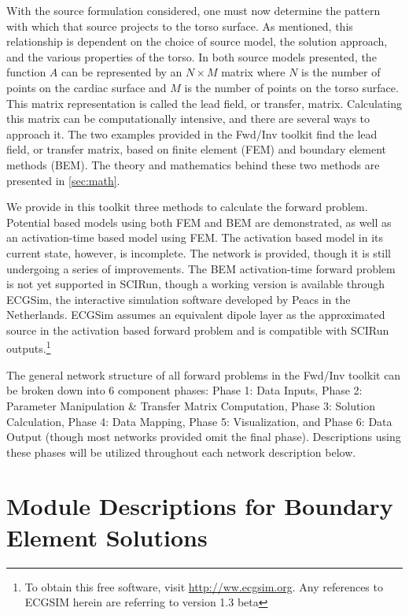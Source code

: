 With the source formulation considered, one must now determine the pattern with which that source projects to the torso surface. As mentioned, this relationship is dependent on the choice of source model, the solution approach, and the various properties of the torso. In both source models presented, the function $A$ can be represented by an $N \times M$ matrix where $N$ is the number of points on the cardiac surface and $M$ is the number of points on the torso surface.  This matrix representation is called the lead field, or transfer, matrix. Calculating this matrix can be computationally intensive, and there are several ways to approach it. The two examples provided in the Fwd/Inv toolkit find the lead field, or transfer matrix, based on finite element (FEM) and boundary element methods (BEM). The theory and mathematics behind these two methods are presented in \autoref{sec:math}.

We provide in this toolkit three methods to calculate the forward problem. Potential based models using both FEM and BEM are demonstrated, as well as an activation-time based model using FEM.
The activation based model in its current state, however, is incomplete.
The network is provided, though it is still undergoing a series of improvements.
The BEM activation-time forward problem is not yet supported in SCIRun, though a working version is available through ECGSim, the interactive simulation software developed by Peacs in the Netherlands. ECGSim assumes an equivalent dipole layer as the approximated source in the activation based forward problem and is compatible with SCIRun outputs.\footnote{To obtain this free software, visit \href{http://www.ecgsim.org/}{http://ww.ecgsim.org}. Any references to ECGSIM herein are referring to version 1.3 beta}

The general network structure of all forward problems in the Fwd/Inv toolkit can be broken down into 6 component phases: Phase 1: Data Inputs, Phase 2: Parameter Manipulation \& Transfer Matrix Computation, Phase 3: Solution Calculation, Phase 4: Data Mapping, Phase 5: Visualization, and Phase 6: Data Output (though most networks provided omit the final phase).
Descriptions using these phases will be utilized throughout each network description below.

\section{Module Descriptions for Boundary Element Solutions}

